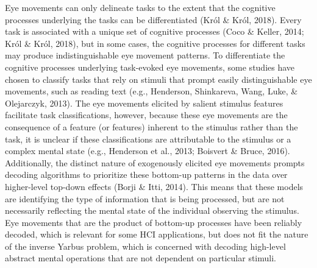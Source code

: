 \documentclass[
  english,
  man,floatsintext]{apa6}
\begin{document}
Eye movements can only delineate tasks to the extent that the cognitive processes underlying the tasks can be differentiated (Król \& Król, 2018). Every task is associated with a unique set of cognitive processes (Coco \& Keller, 2014; Król \& Król, 2018), but in some cases, the cognitive processes for different tasks may produce indistinguishable eye movement patterns. To differentiate the cognitive processes underlying task-evoked eye movements, some studies have chosen to classify tasks that rely on stimuli that prompt easily distinguishable eye movements, such as reading text (e.g., Henderson, Shinkareva, Wang, Luke, \& Olejarczyk, 2013). The eye movements elicited by salient stimulus features facilitate task classifications, however, because these eye movements are the consequence of a feature (or features) inherent to the stimulus rather than the task, it is unclear if these classifications are attributable to the stimulus or a complex mental state (e.g., Henderson et al., 2013; Boisvert \& Bruce, 2016). Additionally, the distinct nature of exogenously elicited eye movements prompts decoding algorithms to prioritize these bottom-up patterns in the data over higher-level top-down effects (Borji \& Itti, 2014). This means that these models are identifying the type of information that is being processed, but are not necessarily reflecting the mental state of the individual observing the stimulus. Eye movements that are the product of bottom-up processes have been reliably decoded, which is relevant for some HCI applications, but does not fit the nature of the inverse Yarbus problem, which is concerned with decoding high-level abstract mental operations that are not dependent on particular stimuli.
\end{document}
